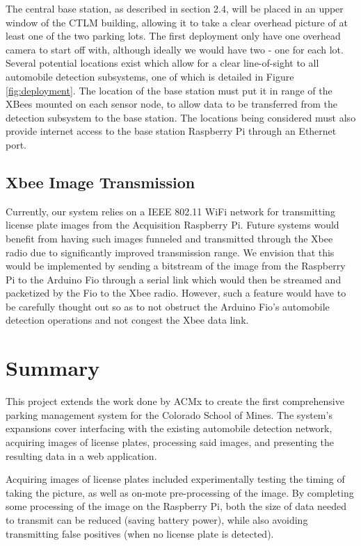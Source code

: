 \documentclass[11pt, oneside, fullpage, doublespace]{article}
\begin{document}
The central base station, as described in section 2.4, will be placed in an upper window of the CTLM building, allowing it to take a clear overhead picture of at least one of the two parking lots. The first deployment only have one overhead camera to start off with, although ideally we would have two - one for each lot. Several potential locations exist which allow for a clear line-of-sight to all automobile detection subsystems, one of which is detailed in Figure \ref{fig:deployment}. The location of the base station must put it in range of the XBees mounted on each sensor node, to allow data to be transferred from the detection subsystem to the base station. The locations being considered must also provide internet access to the base station Raspberry Pi through an Ethernet port.

\subsection{Xbee Image Transmission}
Currently, our system relies on a IEEE 802.11 WiFi network for transmitting license plate images from the Acquisition Raspberry Pi. Future systems would benefit from having such images funneled and transmitted through the Xbee radio due to significantly improved transmission range. We envision that this would be implemented by sending a bitstream of the image from the Raspberry Pi to the Arduino Fio through a serial link which would then be streamed and packetized by the Fio to the Xbee radio. However, such a feature would have to be carefully thought out so as to not obstruct the Arduino Fio's automobile detection operations and not congest the Xbee data link.

\section{Summary}

This project extends the work done by ACMx to create the first comprehensive parking management system for the Colorado School of Mines. The system's expansions cover interfacing with the existing automobile detection network, acquiring images of license plates, processing said images, and presenting the resulting data in a web application.

Acquiring images of license plates included experimentally testing the timing of taking the picture, as well as on-mote pre-processing of the image. By completing some processing of the image on the Raspberry Pi, both the size of data needed to transmit can be reduced (saving battery power), while also avoiding transmitting false positives (when no license plate is detected).
\end{document}
